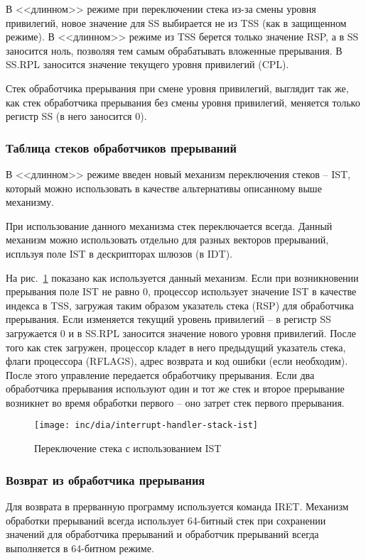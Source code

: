 В <<длинном>> режиме при переключении стека из-за смены уровня привилегий,
новое значение для SS выбирается не из TSS (как в защищенном режиме). В
<<длинном>> режиме из TSS берется только значение RSP, а в SS заносится ноль,
позволяя тем самым обрабатывать вложенные прерывания. В SS.RPL заносится
значение текущего уровня привилегий (CPL).

Стек обработчика прерывания при смене уровня привилегий, выглядит так же, как
стек обработчика прерывания без смены уровня привилегий, меняется только
регистр SS (в него заносится 0).

\subsubsection*{Таблица стеков обработчиков прерываний}
В <<длинном>> режиме введен новый механизм переключения стеков -- IST, который
можно использовать в качестве альтернативы описанному выше механизму.

При использование данного механизма стек переключается всегда. Данный механизм
можно использовать отдельно для разных векторов прерываний, испльзуя поле IST
в дескрипторах шлюзов (в IDT).

На рис.~\ref{fig:interrupt_handler_stack_ist} показано как используется данный
механизм. Если при возникновении прерывания поле IST не равно 0, процессор
использует значение IST в качестве индекса в TSS, загружая таким образом указатель стека
(RSP) для обработчика прерывания. Если изменяется текущий уровень привилегий
-- в регистр SS загружается 0 и в SS.RPL заносится значение нового уровня
привилегий. После того как стек загружен, процессор кладет в него предыдущий
указатель стека, флаги процессора (RFLAGS), адрес возврата и код ошибки (если
необходим). После этого управление передается обработчику прерывания. Если два
обработчика прерывания используют один и тот же стек и второе прерывание
возникнет во время обработки первого -- оно затрет стек первого прерывания.

\begin{figure}
  \centering
  \texttt{[image: inc/dia/interrupt-handler-stack-ist]}
  \caption{Переключение стека с использованием IST}
  \label{fig:interrupt_handler_stack_ist}
\end{figure}

\subsubsection*{Возврат из обработчика прерывания}
Для возврата в прерванную программу используется команда IRET. Механизм
обработки прерываний всегда использует 64-битный стек при сохранении значений
для обработчика прерываний и обработчик прерываний всегда выполняется в
64-битном режиме.

